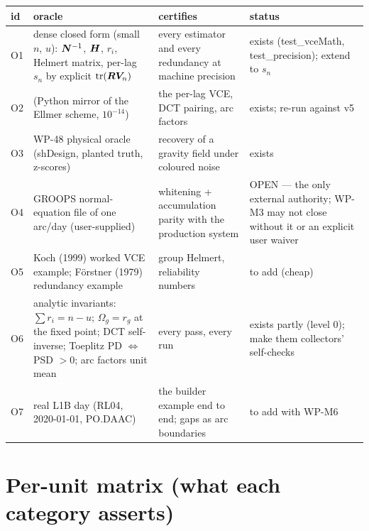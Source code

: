 \begin{longtable}{@{}P{8mm}P{50mm}P{64mm}P{30mm}@{}}
\toprule
id & oracle & certifies & status\\
\midrule
O1 & dense closed form (small $n$, $u$): $\bm{N}^{-1}$, $\bm{H}$, $r_i$, Helmert matrix, per-lag $s_n$ by explicit $\operatorname{tr}(\bm{R}\bm{V}_n)$ & every estimator and every redundancy at machine precision & exists (test\_vceMath, test\_precision); extend to $s_n$\\
O2 &  (Python mirror of the Ellmer scheme, $10^{-14}$) & the per-lag VCE, DCT pairing, arc factors & exists; re-run against v5 \\
O3 & WP-48 physical oracle (shDesign, planted truth, z-scores) & recovery of a gravity field under coloured noise & exists\\
O4 & GROOPS normal-equation file of one arc/day (user-supplied) & whitening + accumulation parity with the production system & OPEN --- the only external authority; WP-M3 may not close without it or an explicit user waiver\\
O5 & Koch (1999) worked VCE example; Förstner (1979) redundancy example & group Helmert, reliability numbers & to add (cheap)\\
O6 & analytic invariants: $\sum r_i = n-u$; $\Omega_g = r_g$ at the fixed point; DCT self-inverse; Toeplitz PD $\Leftrightarrow$ PSD $>0$; arc factors unit mean & every pass, every run & exists partly (level 0); make them collectors' self-checks\\
O7 &  real L1B day (RL04, 2020-01-01, PO.DAAC) & the builder example end to end; gaps as arc boundaries & to add with WP-M6\\
\bottomrule
\end{longtable}

\section{Per-unit matrix (what each category asserts)}

